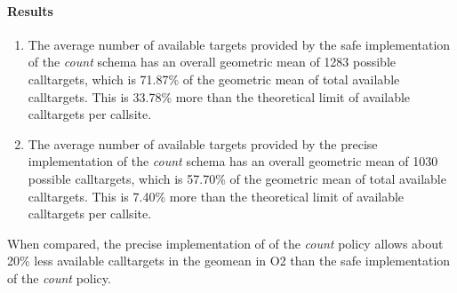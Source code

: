 \paragraph{Results}
\begin{enumerate}
\item The average number of available targets provided by the safe implementation of the \textit{count} schema has an overall geometric mean of  1283 possible calltargets, which is 71.87\% of the geometric mean of total available calltargets. This is 33.78\% more than the theoretical limit of available calltargets per callsite.
\item The average number of available targets provided by the precise implementation of the \textit{count} schema has an overall geometric mean of  1030 possible calltargets, which is 57.70\% of the geometric mean of total available calltargets. This is 7.40\% more than the theoretical limit of available calltargets per callsite.
\end{enumerate}

When compared, the precise implementation of of the \textit{count} policy allows about 20\% less available calltargets in the geomean in O2 than the safe implementation of the \textit{count} policy.


